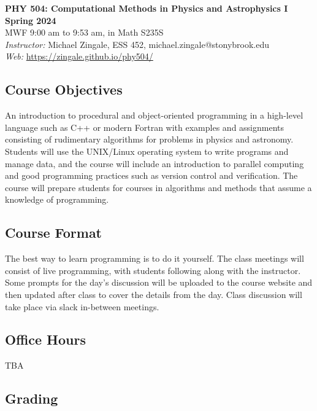 \documentclass[10pt]{article}
\begin{document}
\begin{center}
{\LARGE \sffamily \bfseries PHY 504: Computational Methods in Physics and Astrophysics I} \\[1mm]
{\bfseries Spring 2024} \\
MWF 9:00 am to 9:53 am, in Math S235S\\
{\em  Instructor:} Michael Zingale, ESS 452, michael.zingale@stonybrook.edu \\
{\em Web:}\/ \url{https://zingale.github.io/phy504/}
\end{center}



\subsection*{Course Objectives}

\noindent An introduction to procedural and object-oriented
programming in a high-level language such as C++ or modern Fortran
with examples and assignments consisting of rudimentary algorithms for
problems in physics and astronomy. Students will use the UNIX/Linux
operating system to write programs and manage data, and the course
will include an introduction to parallel computing and good
programming practices such as version control and verification. The
course will prepare students for courses in algorithms and methods
that assume a knowledge of programming.

\subsection*{Course Format}

The best way to learn programming is to do it yourself.  The class
meetings will consist of live programming, with students following
along with the instructor.  Some prompts for the day's discussion will
be uploaded to the course website and then updated after class to
cover the details from the day.  Class discussion will take place via
slack in-between meetings.

\subsection*{Office Hours}

\noindent TBA


\subsection*{Grading}
\end{document}
